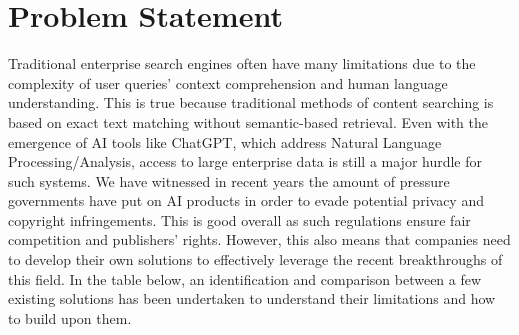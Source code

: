 \section{Problem Statement}
Traditional enterprise search engines often have many limitations due to the complexity of user queries' context comprehension and human language understanding. This is true because traditional methods of content searching is based on exact text matching without semantic-based retrieval. Even with the emergence of AI tools like ChatGPT, which address Natural Language Processing/Analysis, access to large enterprise data is still a major hurdle for such systems. We have witnessed in recent years the amount of pressure governments have put on AI products in order to evade potential privacy and copyright infringements. This is good overall as such regulations ensure fair competition and publishers' rights. However, this also means that companies need to develop their own solutions to effectively leverage the recent breakthroughs of this field.\medskip\newline
In the table below, an identification and comparison between a few existing solutions has been undertaken to understand their limitations and how to build upon them.
